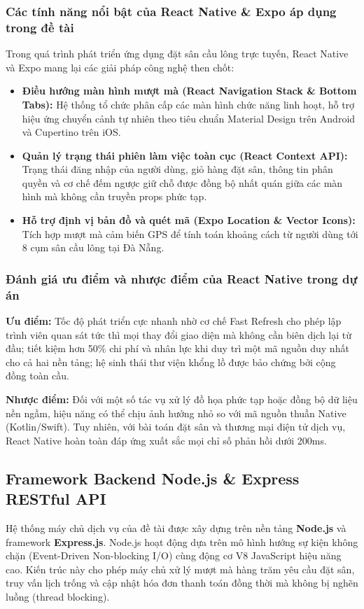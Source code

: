 \subsubsection{Các tính năng nổi bật của React Native \& Expo áp dụng trong đề tài}
Trong quá trình phát triển ứng dụng đặt sân cầu lông trực tuyến, React Native và Expo mang lại các giải pháp công nghệ then chốt:
\begin{itemize}
    \item \textbf{Điều hướng màn hình mượt mà (React Navigation Stack \& Bottom Tabs):} Hệ thống tổ chức phân cấp các màn hình chức năng linh hoạt, hỗ trợ hiệu ứng chuyển cảnh tự nhiên theo tiêu chuẩn Material Design trên Android và Cupertino trên iOS.
    \item \textbf{Quản lý trạng thái phiên làm việc toàn cục (React Context API):} Trạng thái đăng nhập của người dùng, giỏ hàng đặt sân, thông tin phân quyền và cơ chế đếm ngược giữ chỗ được đồng bộ nhất quán giữa các màn hình mà không cần truyền props phức tạp.
    \item \textbf{Hỗ trợ định vị bản đồ và quét mã (Expo Location \& Vector Icons):} Tích hợp mượt mà cảm biến GPS để tính toán khoảng cách từ người dùng tới 8 cụm sân cầu lông tại Đà Nẵng.
\end{itemize}

\subsubsection{Đánh giá ưu điểm và nhược điểm của React Native trong dự án}
\textbf{Ưu điểm:} Tốc độ phát triển cực nhanh nhờ cơ chế Fast Refresh cho phép lập trình viên quan sát tức thì mọi thay đổi giao diện mà không cần biên dịch lại từ đầu; tiết kiệm hơn 50\% chi phí và nhân lực khi duy trì một mã nguồn duy nhất cho cả hai nền tảng; hệ sinh thái thư viện khổng lồ được bảo chứng bởi cộng đồng toàn cầu.

\textbf{Nhược điểm:} Đối với một số tác vụ xử lý đồ họa phức tạp hoặc đồng bộ dữ liệu nền ngầm, hiệu năng có thể chịu ảnh hưởng nhỏ so với mã nguồn thuần Native (Kotlin/Swift). Tuy nhiên, với bài toán đặt sân và thương mại điện tử dịch vụ, React Native hoàn toàn đáp ứng xuất sắc mọi chỉ số phản hồi dưới 200ms.

\subsection{Framework Backend Node.js \& Express RESTful API}
Hệ thống máy chủ dịch vụ của đề tài được xây dựng trên nền tảng \textbf{Node.js} và framework \textbf{Express.js}. Node.js hoạt động dựa trên mô hình hướng sự kiện không chặn (Event-Driven Non-blocking I/O) cùng động cơ V8 JavaScript hiệu năng cao. Kiến trúc này cho phép máy chủ xử lý mượt mà hàng trăm yêu cầu đặt sân, truy vấn lịch trống và cập nhật hóa đơn thanh toán đồng thời mà không bị nghẽn luồng (thread blocking).

